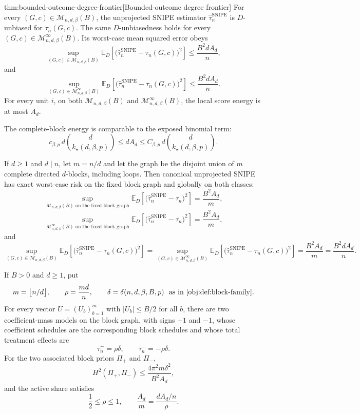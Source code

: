 \begin{theoremv}{thm:bounded-outcome-degree-frontier}[Bounded-outcome degree frontier]
For every \((G,c)\in\mathcal M_{n,d,\beta}(B)\), the unprojected SNIPE estimator \(\widehat\tau_n^{\mathrm{SNIPE}}\) is \(D\)-unbiased for \(\tau_n(G,c)\).  The same \(D\)-unbiasedness holds for every \((G,c)\in\mathcal M_{n,d,\beta}^{\infty}(B)\).  Its worst-case mean squared error obeys
\[
\sup_{(G,c)\in\mathcal M_{n,d,\beta}(B)}
\mathbb E_D\!\left[
\bigl(\widehat\tau_n^{\mathrm{SNIPE}}-\tau_n(G,c)\bigr)^2
\right]
\le
\frac{B^2 d A_d}{n},
\]
and
\[
\sup_{(G,c)\in\mathcal M_{n,d,\beta}^{\infty}(B)}
\mathbb E_D\!\left[
\bigl(\widehat\tau_n^{\mathrm{SNIPE}}-\tau_n(G,c)\bigr)^2
\right]
\le
\frac{B^2 d A_d}{n}.
\]
For every unit \(i\), on both \(\mathcal M_{n,d,\beta}(B)\) and \(\mathcal M_{n,d,\beta}^{\infty}(B)\), the local score energy is at most \(A_d\).

The complete-block energy is comparable to the exposed binomial term:
\[
c_{\beta,p}\, d\binom{d}{k_\star(d,\beta,p)}
\le
dA_d
\le
C_{\beta,p}\, d\binom{d}{k_\star(d,\beta,p)}.
\]

If \(d\ge1\) and \(d\mid n\), let \(m=n/d\) and let the graph be the disjoint union of \(m\) complete directed \(d\)-blocks, including loops.  Then canonical unprojected SNIPE has exact worst-case risk on the fixed block graph and globally on both classes:
\[
\sup_{\mathcal M_{n,d,\beta}(B)\text{ on the fixed block graph}}
\mathbb E_D\!\left[
\bigl(\widehat\tau_n^{\mathrm{SNIPE}}-\tau_n\bigr)^2
\right]
=
\frac{B^2A_d}{m},
\]
\[
\sup_{\mathcal M_{n,d,\beta}^{\infty}(B)\text{ on the fixed block graph}}
\mathbb E_D\!\left[
\bigl(\widehat\tau_n^{\mathrm{SNIPE}}-\tau_n\bigr)^2
\right]
=
\frac{B^2A_d}{m},
\]
and
\[
\sup_{(G,c)\in\mathcal M_{n,d,\beta}(B)}
\mathbb E_D\!\left[
\bigl(\widehat\tau_n^{\mathrm{SNIPE}}-\tau_n(G,c)\bigr)^2
\right]
=
\sup_{(G,c)\in\mathcal M_{n,d,\beta}^{\infty}(B)}
\mathbb E_D\!\left[
\bigl(\widehat\tau_n^{\mathrm{SNIPE}}-\tau_n(G,c)\bigr)^2
\right]
=
\frac{B^2A_d}{m}
=
\frac{B^2dA_d}{n}.
\]

If \(B>0\) and \(d\ge1\), put
\[
m=\bigl\lfloor n/d\bigr\rfloor,
\qquad
\rho=\frac{md}{n},
\qquad
\delta=\delta(n,d,\beta,B,p)\ \text{ as in \cref{obj:def:block-family}}.
\]
For every vector \(U=(U_b)_{b=1}^m\) with \(|U_b|\le B/2\) for all \(b\), there are two coefficient-mass models on the block graph, with signs \(+1\) and \(-1\), whose coefficient schedules are the corresponding block schedules and whose total treatment effects are
\[
\tau_n^{+}=\rho\delta,
\qquad
\tau_n^{-}=-\rho\delta.
\]
For the two associated block priors \(\Pi_+\) and \(\Pi_-\),
\[
H^2(\Pi_+,\Pi_-)
\le
\frac{4\pi^2 m\delta^2}{B^2A_d},
\]
and the active share satisfies
\[
\frac12\le \rho\le 1,
\qquad
\frac{A_d}{m}
=
\frac{dA_d/n}{\rho}.
\]
\end{theoremv}

